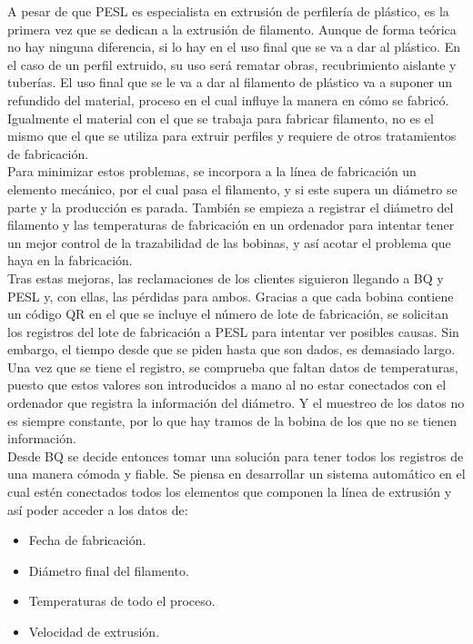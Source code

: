 A pesar de que PESL es especialista en extrusión de perfilería de plástico, es la primera vez que se dedican a la extrusión de filamento. Aunque de forma teórica no hay ninguna diferencia, si lo hay en el uso final que se va a dar al plástico. En el caso de un perfil extruido, su uso será rematar obras, recubrimiento aislante y tuberías. El uso final que se le va a dar al filamento de plástico va a suponer un refundido del material, proceso en el cual influye la manera en cómo se fabricó. Igualmente el material con el que se trabaja para fabricar filamento, no es el mismo que el que se utiliza para extruir perfiles y requiere de otros tratamientos de fabricación.\\ 

Para minimizar estos problemas, se incorpora a la línea de fabricación un elemento mecánico, por el cual pasa el filamento, y si este supera un diámetro se parte y la producción es parada. También se empieza a registrar el diámetro del filamento y las temperaturas de fabricación en un ordenador para intentar tener un mejor control de la trazabilidad de las bobinas, y así acotar el problema que haya en la fabricación.\\

Tras estas mejoras, las reclamaciones de los clientes siguieron llegando a BQ y PESL y, con ellas, las pérdidas para ambos. Gracias a que cada bobina contiene un código QR en el que se incluye el número de lote de fabricación, se solicitan los registros del lote de fabricación a PESL para intentar ver posibles causas. Sin embargo, el tiempo desde que se piden hasta que son dados, es demasiado largo. Una vez que se tiene el registro, se comprueba que faltan datos de temperaturas, puesto que estos valores son introducidos a mano al no estar conectados con el ordenador que registra la información del diámetro. Y el muestreo de los datos no es siempre constante, por lo que hay tramos de la bobina de los que no se tienen información.\\

Desde BQ se decide entonces tomar una solución para tener todos los registros de una manera cómoda y fiable. Se piensa en desarrollar un sistema automático en el cual estén conectados todos los elementos que componen la línea de extrusión y así poder acceder a los datos de:

\begin{itemize}
    \item{Fecha de fabricación.}
    \item{Diámetro final del filamento.}
    \item{Temperaturas de todo el proceso.}
    \item{Velocidad de extrusión.}
\end{itemize}

